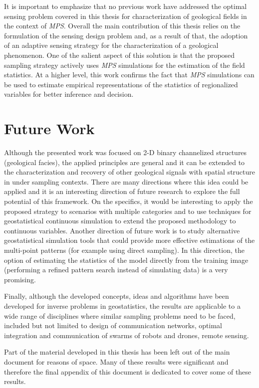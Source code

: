It is important to emphasize that no previous work have addressed the optimal sensing problem covered in this thesis for characterization of geological fields in the context of \emph{MPS}. Overall the main contribution of this thesis relies on the formulation of the sensing design problem and, as a result of that,  the adoption of an adaptive sensing strategy for the characterization of a geological phenomenon. One of the salient aspect of this solution is that the proposed sampling strategy actively uses  \emph{MPS} simulations for  the estimation of the field statistics. At a higher level, this work confirms the fact that \emph{MPS} simulations can be used to estimate empirical representations of the statistics of regionalized variables for better inference and decision.

\section{Future Work}

Although the presented work was focused on 2-D binary channelized structures (geological facies), the applied principles are general and it can be extended to the characterization and recovery of other geological signals with spatial structure in under sampling contexts. There are many directions where this idea could be applied and it is an interesting direction of future research to explore the full potential of this framework. On the specifics, it would be interesting to apply the proposed strategy to scenarios with multiple categories and to use techniques for geostatistical continuous simulation to extend the proposed methodology to continuous variables. Another direction of future work is to study alternative geostatistical simulation tools that could provide more effective estimations of the multi-point patterns (for example using direct sampling). In this direction, the option of estimating the statistics of the model directly from the training image (performing a refined pattern search instead of simulating data) is a very promising.

Finally, although the developed concepts, ideas and algorithms have been developed for inverse problems in geostatistics, the results are applicable to a wide range of disciplines where similar sampling problems need to be faced, included but not limited to design of communication networks, optimal integration and communication of swarms of robots and drones, remote sensing.

Part of the material developed in this thesis has been left out of the main document for reasons of space. Many of these results were significant and therefore the final appendix of this document is dedicated to cover some of these results.



